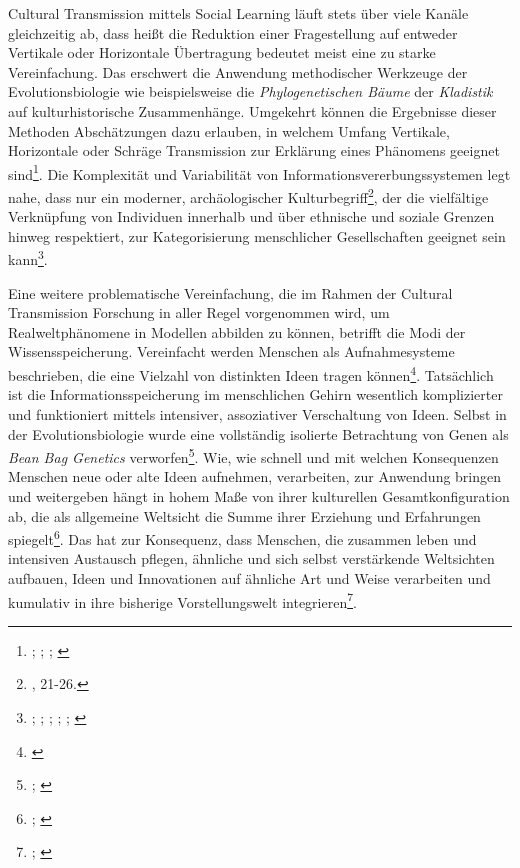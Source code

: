 \documentclass[openany,twoside,twocolumn]{book}
\let\rmarkdownfootnote\footnote%
\def\footnote{\protect\rmarkdownfootnote}
\begin{document}
Cultural Transmission mittels Social Learning läuft stets über viele
Kanäle gleichzeitig ab, dass heißt die Reduktion einer Fragestellung auf
entweder Vertikale oder Horizontale Übertragung bedeutet meist eine zu
starke Vereinfachung. Das erschwert die Anwendung methodischer Werkzeuge
der Evolutionsbiologie wie beispielsweise die \emph{Phylogenetischen
Bäume} der \emph{Kladistik} auf kulturhistorische Zusammenhänge.
Umgekehrt können die Ergebnisse dieser Methoden Abschätzungen dazu
erlauben, in welchem Umfang Vertikale, Horizontale oder Schräge
Transmission zur Erklärung eines Phänomens geeignet sind\footnote{\textcite{jordan_cultural_2003};
  \textcite{mcclure_cultural_2004}; \textcite{mcclure_gender_2007};
  \textcite{tehrani_investigating_2002}}. Die Komplexität und
Variabilität von Informationsvererbungssystemen legt nahe, dass nur ein
moderner, archäologischer Kulturbegriff\footnote{\textcite{furholt_nordlichen_2009},
  21-26.}, der die vielfältige Verknüpfung von Individuen innerhalb und
über ethnische und soziale Grenzen hinweg respektiert, zur
Kategorisierung menschlicher Gesellschaften geeignet sein kann\footnote{\textcite{lipo_science_2001};
  \textcite{lipo_population_1997}; \textcite{palmer_tools_2005};
  \textcite{palmer_cultural_1995-1}; \textcite{palmer_categories_1997};
  \textcite{mcelreath_shared_2003}}.

Eine weitere problematische Vereinfachung, die im Rahmen der Cultural
Transmission Forschung in aller Regel vorgenommen wird, um
Realweltphänomene in Modellen abbilden zu können, betrifft die Modi der
Wissensspeicherung. Vereinfacht werden Menschen als Aufnahmesysteme
beschrieben, die eine Vielzahl von distinkten Ideen tragen
können\footnote{\textcite{mithen_cognitive_1997}}. Tatsächlich ist die
Informationsspeicherung im menschlichen Gehirn wesentlich komplizierter
und funktioniert mittels intensiver, assoziativer Verschaltung von
Ideen. Selbst in der Evolutionsbiologie wurde eine vollständig isolierte
Betrachtung von Genen als \emph{Bean Bag Genetics} verworfen\footnote{\textcite{de_winter_beanbag_1997};
  \textcite{mayr_where_1959}}. Wie, wie schnell und mit welchen
Konsequenzen Menschen neue oder alte Ideen aufnehmen, verarbeiten, zur
Anwendung bringen und weitergeben hängt in hohem Maße von ihrer
kulturellen Gesamtkonfiguration ab, die als allgemeine Weltsicht die
Summe ihrer Erziehung und Erfahrungen spiegelt\footnote{\textcite{gabora_ideas_2004};
  \textcite{sperber_explaining_1996}}. Das hat zur Konsequenz, dass
Menschen, die zusammen leben und intensiven Austausch pflegen, ähnliche
und sich selbst verstärkende Weltsichten aufbauen, Ideen und
Innovationen auf ähnliche Art und Weise verarbeiten und kumulativ in
ihre bisherige Vorstellungswelt integrieren\footnote{\textcite{eerkens_cultural_2007};
  \textcite{basalla_evolution_1988}}.
\end{document}

